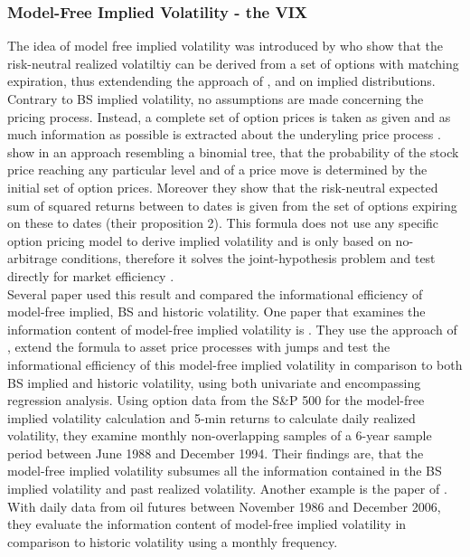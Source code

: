 \subsubsection{Model-Free Implied Volatility - the VIX}\label{sec:223VIX}
The idea of model free implied volatility was introduced by \textcite{britten2000} who show that the risk-neutral realized volatiltiy can be derived from a set of options with matching expiration, thus extendending the approach of \textcite{derman1994} \textcite{dupire1994}, \textcite{dupire1997} and \textcite{rubinstein1994} on implied distributions. Contrary to \ac{BS} implied volatility, no assumptions are made concerning the pricing process. Instead, a complete set of option prices is taken as given and as much information as possible is extracted about the underyling price process \parencite{britten2000}. \\
\textcite{britten2000} show in an approach resembling a binomial tree, that the probability of the stock price reaching any particular level and of a price move is determined by the initial set of option prices. Moreover they show that the risk-neutral expected sum of squared returns between to dates is given from the set of options expiring on these to dates (their proposition 2). This formula does not use any specific option pricing model to derive implied volatility and is only based on no-arbitrage conditions, therefore it solves the joint-hypothesis problem and test directly for market efficiency \parencite{jiang2003}. \\
Several paper used this result and compared the informational efficiency of model-free implied, \ac{BS} and historic volatility. One paper that examines the information content of model-free implied volatility is \textcite{jiang2003}. They use the approach of \textcite{britten2000}, extend the formula to asset price processes with jumps and test the informational efficiency of this model-free implied volatility in comparison to both \ac{BS} implied and historic volatility, using both univariate and encompassing regression analysis. Using option data from the S\&P 500 for the model-free implied volatility calculation and 5-min returns to calculate daily realized volatility, they examine monthly non-overlapping samples of a 6-year sample period between June 1988 and December 1994. Their findings are, that the model-free implied volatility subsumes all the information contained in the \ac{BS} implied volatility and past realized volatility. Another example is the paper of \textcite{bakanova2010}. With daily data from oil futures between November 1986 and December 2006, they evaluate the information content of model-free implied volatility in comparison to historic volatility using a monthly frequency. 
